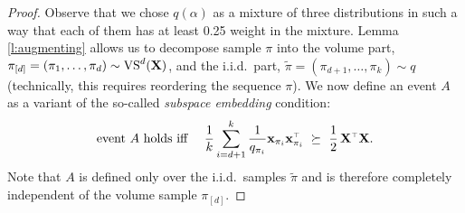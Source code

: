 \documentclass[12pt]{sty/colt2019/colt2018-arxiv}
\begin{document}
\begin{proof}
Observe that we chose $q(\alpha)$ as a
mixture of three distributions in such a way that each of them
has at least 0.25 weight in the mixture. Lemma
    \ref{l:augmenting} allows us to decompose sample $\pi$ into
    the volume part, $\pi_{[d]}=(\pi_1,\dots,\pi_d)\sim {\mathrm{VS}}^d(\mathbf X)$,
    and the i.i.d.~part, 
    $\tilde{\pi}=(\pi_{d+1},\dots,\pi_k)\sim q $ (technically, this
    requires reordering the sequence $\pi$). We now define an event $A$ as a variant of the so-called
    \textit{subspace  embedding} condition:
    \begin{align*}
      \text{event $A$ holds iff }\quad
\frac1k\sum_{i=d+1}^k\frac1{q_{\pi_i}}\x_{\pi_i}\x_{\pi_i}^\top\
      \succeq\ \frac12\,\X^\top\X.  
    \end{align*}
    Note that $A$ is  defined only over the i.i.d.~samples
    $\tilde{\pi}$ and is therefore completely independent of the volume sample
    $\pi_{[d]}$.

\end{proof}
\end{document}
